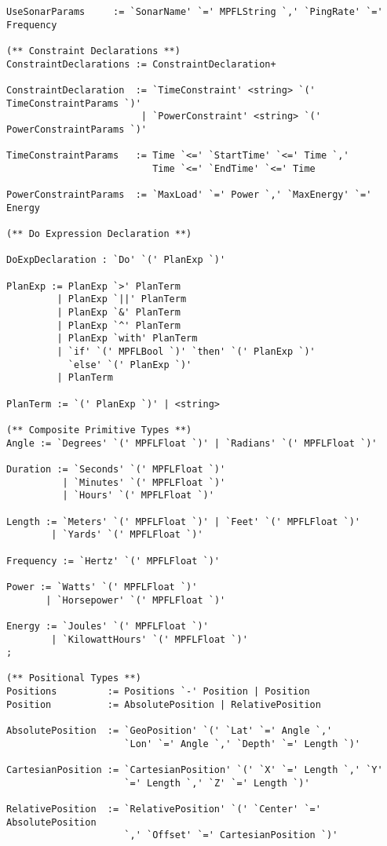 \begin{verbatim}
UseSonarParams     := `SonarName' `=' MPFLString `,' `PingRate' `=' Frequency

(** Constraint Declarations **)
ConstraintDeclarations := ConstraintDeclaration+

ConstraintDeclaration  := `TimeConstraint' <string> `(' TimeConstraintParams `)'
                        | `PowerConstraint' <string> `(' PowerConstraintParams `)'

TimeConstraintParams   := Time `<=' `StartTime' `<=' Time `,' 
                          Time `<=' `EndTime' `<=' Time

PowerConstraintParams  := `MaxLoad' `=' Power `,' `MaxEnergy' `=' Energy

(** Do Expression Declaration **)

DoExpDeclaration : `Do' `(' PlanExp `)'

PlanExp := PlanExp `>' PlanTerm
         | PlanExp `||' PlanTerm
         | PlanExp `&' PlanTerm
         | PlanExp `^' PlanTerm
         | PlanExp `with' PlanTerm                  
         | `if' `(' MPFLBool `)' `then' `(' PlanExp `)'
           `else' `(' PlanExp `)'
         | PlanTerm

PlanTerm := `(' PlanExp `)' | <string>          

(** Composite Primitive Types **)
Angle := `Degrees' `(' MPFLFloat `)' | `Radians' `(' MPFLFloat `)' 

Duration := `Seconds' `(' MPFLFloat `)'
          | `Minutes' `(' MPFLFloat `)'
          | `Hours' `(' MPFLFloat `)'

Length := `Meters' `(' MPFLFloat `)' | `Feet' `(' MPFLFloat `)'
        | `Yards' `(' MPFLFloat `)'

Frequency := `Hertz' `(' MPFLFloat `)'

Power := `Watts' `(' MPFLFloat `)'
       | `Horsepower' `(' MPFLFloat `)'

Energy := `Joules' `(' MPFLFloat `)'
        | `KilowattHours' `(' MPFLFloat `)'
;

(** Positional Types **)
Positions         := Positions `-' Position | Position
Position          := AbsolutePosition | RelativePosition

AbsolutePosition  := `GeoPosition' `(' `Lat' `=' Angle `,' 
                     `Lon' `=' Angle `,' `Depth' `=' Length `)'

CartesianPosition := `CartesianPosition' `(' `X' `=' Length `,' `Y'
                     `=' Length `,' `Z' `=' Length `)'

RelativePosition  := `RelativePosition' `(' `Center' `=' AbsolutePosition
                     `,' `Offset' `=' CartesianPosition `)'



\end{verbatim}
